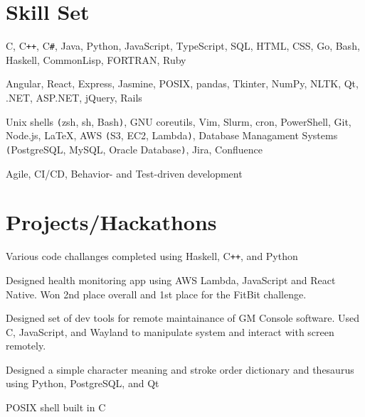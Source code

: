 \documentclass[11pt]{article}
\begin{document}
\vspace*{-10pt}
\section*{Skill Set}
\vspace*{-10pt}\hspace*{10pt}\begin{minipage}{0.935\textwidth}
    \begin{description}
        \raggedright
        \item[Languages] C, C\texttt{++}, C\texttt{\#}, Java, Python, JavaScript, TypeScript, SQL, HTML, CSS, Go, Bash, Haskell,
            CommonLisp, FORTRAN, Ruby
        \item[Frameworks\texttt{/}Libraries] Angular, React, Express, Jasmine, POSIX, pandas, Tkinter, NumPy, NLTK,
            Qt, .NET, ASP.NET, jQuery, Rails
        \item[Tools] Unix shells \texttt{(}zsh, sh, Bash\texttt{)}, GNU coreutils, Vim, Slurm, cron, PowerShell, Git, Node.js,
            \LaTeX, AWS \texttt{(}S3, EC2, Lambda\texttt{)}, Database Managament Systems \texttt{(}PostgreSQL, MySQL, Oracle
            Database\texttt{)}, Jira, Confluence
        \item[Methodologies] Agile, CI/CD, Behavior- and Test-driven development
    \end{description}
\end{minipage}

\vspace*{-10pt}
\section*{Projects/Hackathons}
\vspace*{-10pt}\hspace*{10pt}\begin{minipage}{0.93\textwidth}
    \begin{description}
        \raggedright
        \item[Advent of Code] Various code challanges completed using Haskell, C\texttt{++}, and Python
        \item[DHack] Designed health monitoring app using AWS Lambda, JavaScript and React Native. Won 2nd place overall and 1st
            place for the FitBit challenge.
        \item[MHacks 8] Designed set of dev tools for remote maintainance of GM Console software. Used C, JavaScript, and
            Wayland to manipulate system and interact with screen remotely.
        \item[Chinese Character Dictionary] Designed a simple character meaning and stroke order dictionary and thesaurus using
            Python, PostgreSQL, and Qt
        \item[Mock Terminal] POSIX shell built in C
    \end{description}
\end{minipage}
\end{document}
